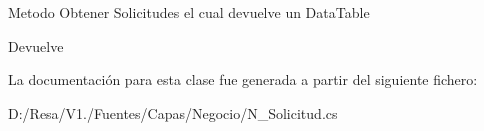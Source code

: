 Metodo Obtener Solicitudes el cual devuelve un Data\+Table 

\begin{DoxyReturn}{Devuelve}

\end{DoxyReturn}


La documentación para esta clase fue generada a partir del siguiente fichero\+:\begin{DoxyCompactItemize}
\item 
D\+:/\+Resa/\+V1./\+Fuentes/\+Capas/\+Negocio/N\+\_\+\+Solicitud.\+cs\end{DoxyCompactItemize}
